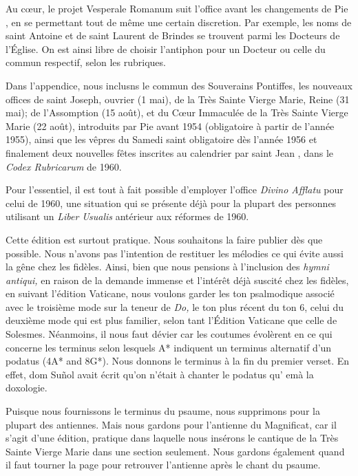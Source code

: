 \begin{frpars}

Au cœur, le projet Vesperale Romanum suit l'office avant les changements de Pie , en se permettant tout de même une certain discretion. Par exemple, les noms de saint Antoine et de saint Laurent de Brindes se trouvent parmi les Docteurs de l'Église. On est ainsi libre de choisir l'antiphon pour un Docteur ou celle du commun respectif, selon les rubriques.

Dans l'appendice, nous inclusns le commun des Souverains Pontiffes, les nouveaux offices de saint Joseph, ouvrier (1 mai), de la Très Sainte Vierge Marie, Reine (31 mai); de l'Assomption (15 août), et du Cœur Immaculée de la Très Sainte Vierge Marie (22 août), introduits par Pie  avant 1954 (obligatoire à partir de l'année 1955), ainsi que les vêpres du Samedi saint obligatoire dès l'année 1956 et finalement deux nouvelles fêtes inscrites au calendrier par saint Jean , dans le \textit{Codex Rubricarum} de 1960.

Pour l'essentiel, il est tout à fait possible d'employer l'office \textit{Divino Afflatu} pour celui de 1960, une situation qui se présente déjà pour la plupart des personnes utilisant un \textit{Liber Usualis} antérieur aux réformes de 1960.

Cette édition est surtout pratique. Nous souhaitons la faire publier dès que possible. Nous n'avons pas l'intention de restituer les mélodies ce qui évite aussi la gêne chez les fidèles. Ainsi, bien que nous pensions à l'inclusion des \textit{hymni antiqui,} en raison de la demande immense et l'intérêt déjà suscité chez les fidèles, en suivant l'édition Vaticane, nous voulons garder les ton psalmodique associé avec le troisième mode sur la teneur de \textit{Do,} le ton plus récent du ton 6, celui du deuxième mode qui est plus familier, selon tant l'Édition Vaticane que celle de Solesmes. Néanmoins, il nous faut dévier car les coutumes évolèrent en ce qui concerne les terminus selon lesquels A* indiquent un terminus alternatif d'un podatus  (4A* and 8G*). Nous donnons le terminus à la fin du premier verset. En effet, dom Suñol avait écrit qu'on n'était à chanter le podatus qu' emà la doxologie.

Puisque nous fournissons le terminus du psaume, nous supprimons  pour la plupart des antiennes. Mais nous gardons  pour l'antienne du Magnificat, car il s'agit d'une édition, pratique dans laquelle nous insérons le cantique de la Très Sainte Vierge Marie dans une section seulement. Nous gardons également  quand il faut tourner la page pour retrouver l'antienne après le chant du psaume.


\end{frpars}
